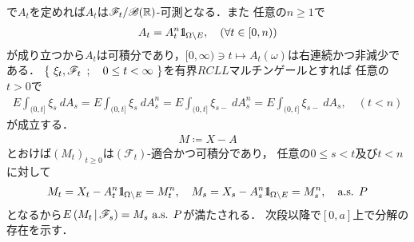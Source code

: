 \begin{prf}
\begin{description}
				で$A_t$を定めれば$A_t$は$\mathscr{F}_t/\mathscr{B}(\mathbb{R})$-可測となる．また
				任意の$n \geq 1$で
				\begin{align}
					A_t = A^n_t \mbox{1}\hspace{-0.25em}\mbox{l}_{\Omega \backslash E}, \quad (\forall t \in [0,n))
				\end{align}
				が成り立つから$A_t$は可積分であり，$[0,\infty) \ni t \longmapsto A_t(\omega)$は右連続かつ非減少である．
				$\left\{\ \xi_t,\mathscr{F}_t\ \, ; \quad 0 \leq t < \infty\ \right\}$を有界$RCLL$マルチンゲールとすれば
				任意の$t > 0$で
				\begin{align}
					E \int_{(0,t]} \xi_s\ dA_s = E \int_{(0,t]} \xi_s\ dA^n_s 
					= E \int_{(0,t]} \xi_{s-}\ dA^n_s = E \int_{(0,t]} \xi_{s-}\ dA_s,
					\quad (t < n)
				\end{align}
				が成立する．
				\begin{align}
					M \coloneqq X - A
				\end{align}
				とおけば$(M_t)_{t \geq 0}$は$(\mathscr{F}_t)$-適合かつ可積分であり，
				任意の$0 \leq s < t$及び$t < n$に対して
				\begin{align}
					M_t = X_t - A^n_t \mbox{1}\hspace{-0.25em}\mbox{l}_{\Omega \backslash E} = M^n_t,
					\quad M_s = X_s - A^n_s \mbox{1}\hspace{-0.25em}\mbox{l}_{\Omega \backslash E} = M^n_s,
					\quad \mbox{a.s. $P$}
				\end{align}
				となるから$E\left( M_t \, \middle|\, \mathscr{F}_s \right) = M_s\ \mbox{a.s. $P$}$が満たされる．
				次段以降で$[0,a]$上で分解の存在を示す．
			

\end{description}
\end{prf}
